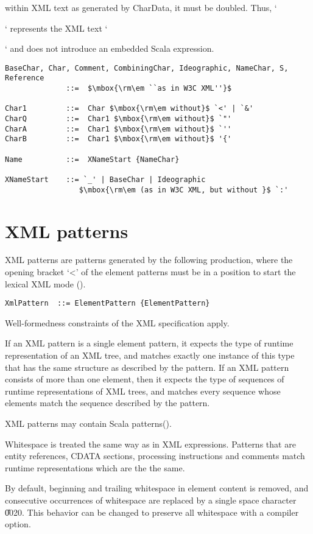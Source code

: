 within XML text as generated by CharData, it must be doubled. Thus, `{{` 
represents the XML text `{` and does not introduce an embedded Scala 
expression.

\syntax\begin{lstlisting}
BaseChar, Char, Comment, CombiningChar, Ideographic, NameChar, S, Reference
              ::=  $\mbox{\rm\em ``as in W3C XML''}$

Char1         ::=  Char $\mbox{\rm\em without}$ `<' | `&'
CharQ         ::=  Char1 $\mbox{\rm\em without}$ `"'
CharA         ::=  Char1 $\mbox{\rm\em without}$ `''
CharB         ::=  Char1 $\mbox{\rm\em without}$ '{'

Name          ::=  XNameStart {NameChar}

XNameStart    ::= `_' | BaseChar | Ideographic 
                 $\mbox{\rm\em (as in W3C XML, but without }$ `:'

\end{lstlisting}
\section{XML patterns}\label{sec:xml-pats}
XML patterns are patterns generated by the following production, where
the opening bracket `<' of the element patterns must be in a position
to start the lexical XML mode ().

\syntax\begin{lstlisting}
XmlPattern  ::= ElementPattern {ElementPattern}
\end{lstlisting}
Well-formedness constraints of the XML specification apply.

If an XML pattern is a single element pattern, it expects the type of runtime
representation of an XML tree, and matches exactly one instance of this type
that has the same structure as described by the pattern. If an XML pattern 
consists of more than one element, then it expects the type of sequences
of runtime representations of XML trees, and matches every sequence whose 
elements match the sequence described by the pattern.

XML patterns may contain Scala patterns().

Whitespace is treated the same way as in XML expressions. Patterns 
that are entity references, CDATA sections, processing 
instructions and comments match runtime representations which are the
the same.

By default, beginning and trailing whitespace in element content is removed, 
and consecutive occurrences of whitespace are replaced by a single space
character \U{0020}. This behavior can be changed to preserve all whitespace
with a compiler option.

}}}
